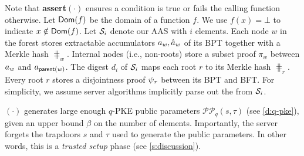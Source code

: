 Note that \textbf{assert$(\cdot)$} ensures a condition is true or fails the calling function otherwise. 
Let $\mathsf{Dom}(f)$ be the domain of a function $f$. %
We use $f(x)=\bot$ to indicate $x\notin \mathsf{Dom}(f)$.
Let $\mathcal{S}_i$ denote our AAS with $i$ elements.
Each node $w$ in the forest stores extractable accumulators $\textcolor{black}{a}_w, \textcolor{black}{\hat{a}}_w$ of its BPT together with a Merkle hash $\hash_w$.
Internal nodes (i.e., non-roots) store a subset proof $\pi_w$ between $\textcolor{black}{a}_w$ and $\textcolor{black}{a}_{\mathsf{parent}(w)}$.
The digest $d_i$ of $\mathcal{S}_i$ maps each root $r$ to its Merkle hash $\hash_r$.
Every root $r$ stores a disjointness proof $\textcolor{black}{\psi}_r$ between its BPT and BFT.
For simplicity, we assume server algorithms implicitly parse out the  from $\mathcal{S}_i$.

{\setup}$(\cdot)$ generates large enough $q$-PKE public parameters $\mathcal{PP}_q(s,\tau)$ (see \cref{d:q-pke}), given an upper bound $\beta$ on the number of elements.
Importantly, the server forgets the trapdoors $s$ and $\tau$ used to generate the public parameters.
In other words, this is a \emph{trusted setup} phase (see \cref{s:discussion}).

%
%
%

